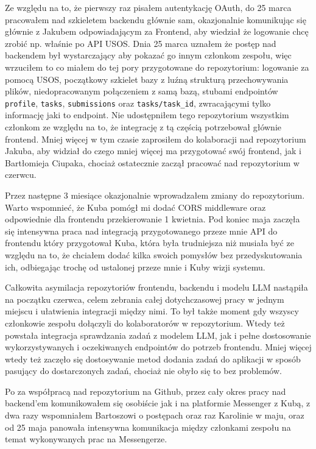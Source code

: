 \documentclass[12pt,a4paper]{article}
\begin{document}
Ze względu na to, że pierwszy raz pisałem autentykację OAuth, do 25 marca pracowałem nad szkieletem backendu głównie sam, okazjonalnie komunikując się głównie z Jakubem odpowiadającym za Frontend, aby wiedział że logowanie chcę zrobić np. właśnie po API USOS. Dnia 25 marca uznałem że postęp nad backendem był wystarczający aby pokazać go innym członkom zespołu, więc wrzuciłem to co miałem do tej pory przygotowane do repozytorium: logowanie za pomocą USOS, początkowy szkielet bazy z luźną strukturą przechowywania plików, niedopracowanym połączeniem z samą bazą, stubami endpointów \texttt{profile}, \texttt{tasks}, \texttt{submissions} oraz \texttt{tasks/task\_id}, zwracającymi tylko informację jaki to endpoint. Nie udostępniłem tego repozytorium wszystkim członkom ze względu na to, że integrację z tą częścią potrzebował głównie frontend. Mniej więcej w tym czasie zaprosiłem do kolaboracji nad repozytorium Jakuba, aby widział do czego mniej więcej ma przygotować swój frontend, jak i Bartłomieja Ciupaka, chociaż ostatecznie zaczął pracować nad repozytorium w czerwcu.

Przez następne 3 miesiące okazjonalnie wprowadzałem zmiany do repozytorium. Warto wspomnieć, że Kuba pomógł mi dodać CORS middleware oraz odpowiednie dla frontendu przekierowanie 1 kwietnia. Pod koniec maja zaczęła się intensywna praca nad integracją przygotowanego przeze mnie API do frontendu który przygotował Kuba, która była trudniejsza niż musiała być ze względu na to, że chciałem dodać kilka swoich pomysłów bez przedyskutowania ich, odbiegając trochę od ustalonej przeze mnie i Kuby wizji systemu. 

Całkowita asymilacja repozytoriów frontendu, backendu i modelu LLM nastąpiła na początku czerwca, celem zebrania całej dotychczasowej pracy w jednym miejscu i ułatwienia integracji między nimi. To był także moment gdy wszyscy członkowie zespołu dołączyli do kolaboratorów w repozytorium. Wtedy też powstała integracja sprawdzania zadań z modelem LLM, jak i pełne dostosowanie wykorzystywanych i oczekiwanych endpointów do potrzeb frontendu. Mniej więcej wtedy też zaczęło się dostosywanie metod dodania zadań do aplikacji w sposób pasujący do dostarczonych zadań, chociaż nie obyło się to bez problemów. 

Po za współpracą nad repozytorium na Github, przez cały okres pracy nad backend'em komunikowałem się osobiście jak i na platformie Messenger z Kubą, z dwa razy wspomniałem Bartoszowi o postępach oraz raz Karolinie w maju, oraz od 25 maja panowała intensywna komunikacja między członkami zespołu na temat wykonywanych prac na Messengerze.
\end{document}
